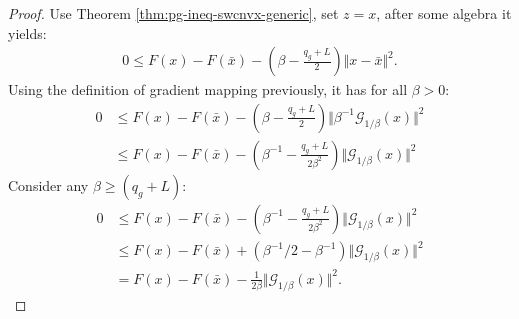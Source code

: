 \documentclass[12pt]{report}
\begin{document}
            \begin{proof}
                Use Theorem \ref{thm:pg-ineq-swcnvx-generic}, set $z = x$, after some algebra it yields: 
                \begin{align*}
                    0 \le F(x) - F(\bar x) - \left(
                        \beta - \frac{q_g + L}{2}
                    \right)\Vert x - \bar x\Vert^2. 
                \end{align*}
                Using the definition of gradient mapping previously, it has for all $\beta > 0$: 
                \begin{align*}
                    0 &\le F(x) - F(\bar x) - \left(
                        \beta - \frac{q_g + L}{2}
                    \right)\Vert \beta^{-1}\mathcal G_{1/\beta}(x) \Vert^2
                    \\
                    &\le F(x) - F(\bar x) - \left(
                        \beta^{-1} - \frac{q_g + L}{2\beta^2}
                    \right)\Vert\mathcal G_{1/\beta}(x) \Vert^2
                \end{align*}
                Consider any $\beta \ge (q_g + L)$: 
                \begin{align*}
                    0 &\le F(x) - F(\bar x) - \left(
                        \beta^{-1} - \frac{q_g + L}{2\beta^2}
                    \right)\Vert\mathcal G_{1/\beta}(x) \Vert^2
                    \\
                    &\le F(x) - F(\bar x) + \left(
                        \beta^{-1}/2 - \beta^{-1}
                    \right)\Vert\mathcal G_{1/\beta}(x) \Vert^2
                    \\
                    &= 
                    F(x) - F(\bar x) - \frac{1}{2\beta}\Vert\mathcal G_{1/\beta}(x) \Vert^2. 
                \end{align*}
            \end{proof}
\end{document}
